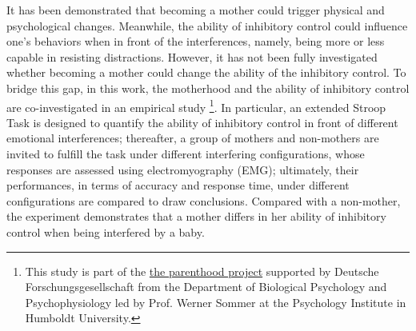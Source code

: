 
It has been demonstrated that 
becoming a mother
could trigger physical and   
psychological changes.
Meanwhile, 
the ability of inhibitory control could influence one's
behaviors when in front of the interferences, namely,
being more or less capable in resisting distractions.
However, it has not been fully investigated 
whether becoming a mother could change the ability
of the inhibitory control.
To bridge this gap,
in this work, 
the motherhood and the ability of inhibitory control 
are co-investigated in an empirical study
\footnote{This study is part of the 
\href{https://www.psychologie.hu-berlin.de/de/prof/bio/forschung/forschungsprojekte}{the parenthood project}
supported by Deutsche Forschungsgesellschaft
from the Department of Biological Psychology and Psychophysiology led by Prof. Werner Sommer at the Psychology Institute in Humboldt University.}.
In particular, 
an extended Stroop Task is  
designed to quantify the ability of inhibitory control
in front of different emotional interferences;
thereafter,
a group of mothers and non-mothers are invited to 
fulfill the task under different interfering configurations, whose responses are assessed
using electromyography (EMG);
ultimately,
their performances, in terms of accuracy and response time,
under different configurations are
compared to draw conclusions.
Compared with a non-mother,
the experiment demonstrates that 
a mother differs in her ability of inhibitory control
when being interfered by a baby.